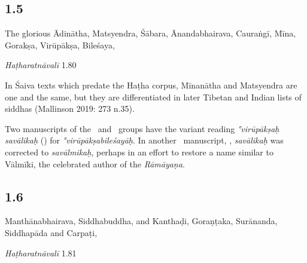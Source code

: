 \begin{ekdosis}
\subsection*{1.5}
\begin{translation}[hp01_005]
The glorious Ādinātha, Matsyendra, Śābara, Ānandabhairava, Cauraṅgī, Mīna, Gorakṣa, Virūpākṣa, Bileśaya,
\end{translation}

\begin{testimonia}[hp01_005]
\emph{Haṭharatnāvalī} 1.80

\begin{versinnote}
\end{versinnote}

\end{testimonia}

\begin{philcomm}[hp01_005]     
In Śaiva texts which predate the Haṭha corpus, Mīnanātha and Matsyendra are one and the same, but they are differentiated in later Tibetan and Indian lists of siddhas (Mallinson 2019: 273 n.35).   

Two manuscripts of the \textalpha\ and \textdelta\ groups have the variant reading \emph{°virūpākṣaḥ savālikaḥ} () for \emph{°virūpākṣabileśayāḥ}. In another \textalpha\ manuscript, , \emph{savālikaḥ} was corrected to \emph{savālmikaḥ}, perhaps in an effort to restore a name similar to Vālmīki, the celebrated author of the \textit{Rāmāyaṇa}.
\end{philcomm}

\subsection*{1.6}
\begin{translation}[hp01_006]
Manthānabhairava, Siddhabuddha, and Kanthaḍi, Goraṇṭaka, Surānanda, Siddhapāda and Carpaṭi,
\end{translation}

\begin{testimonia}[hp01_006]
\emph{Haṭharatnāvalī} 1.81

\begin{versinnote}
\tl{\var{korandakaḥ ] gonandaka P,T,J,n1,n4}\\!}
\end{versinnote}


\end{testimonia}
\end{ekdosis}

